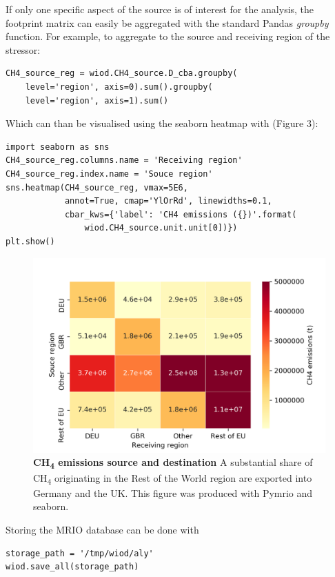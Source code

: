 \documentclass{jors}
\begin{document}
{If only one specific aspect of the source is of interest for the analysis, the footprint matrix can easily be aggregated with the standard Pandas {\it groupby} function.
For example, to aggregate to the source and receiving region of the stressor:

\begin{lstlisting}
CH4_source_reg = wiod.CH4_source.D_cba.groupby(
    level='region', axis=0).sum().groupby(
    level='region', axis=1).sum()
\end{lstlisting}

Which can than be visualised using the seaborn heatmap \cite{waskom2017} with (Figure 3):

\begin{lstlisting}
import seaborn as sns
CH4_source_reg.columns.name = 'Receiving region'
CH4_source_reg.index.name = 'Souce region'
sns.heatmap(CH4_source_reg, vmax=5E6, 
            annot=True, cmap='YlOrRd', linewidths=0.1,
            cbar_kws={'label': 'CH4 emissions ({})'.format(
                wiod.CH4_source.unit.unit[0])})
plt.show()
\end{lstlisting}

  \begin{figure}[h!]
      \includegraphics[width=.9\textwidth]{./fig/airch4_source_reg.png}
      \caption{\textbf{CH\textsubscript{4} emissions source and destination}
      A substantial share of CH\textsubscript{4} originating in the Rest of the World region are exported into Germany and the UK.
      This figure was produced with Pymrio and seaborn. }
      \end{figure}


Storing the MRIO database can be done with 

\begin{lstlisting}
storage_path = '/tmp/wiod/aly'
wiod.save_all(storage_path)
\end{lstlisting}

}
\end{document}
